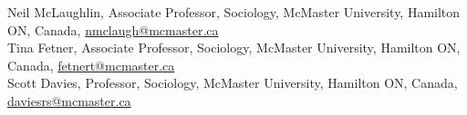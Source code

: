 \documentclass[11pt,usenames,dvipsnames]{article}
\begin{document}




\noindent Neil McLaughlin, Associate Professor, Sociology, McMaster University, Hamilton ON, Canada, \href{mailto:nmclaugh@mcmaster.ca}{nmclaugh@mcmaster.ca}\\

\noindent Tina Fetner, Associate Professor, Sociology, McMaster University, Hamilton ON, Canada, \href{mailto:fetnert@mcmaster.ca}{fetnert@mcmaster.ca}\\

\noindent Scott Davies, Professor, Sociology, McMaster University, Hamilton ON, Canada, \href{mailto:daviesrs@mcmaster.ca}{daviesrs@mcmaster.ca}
\end{document}
